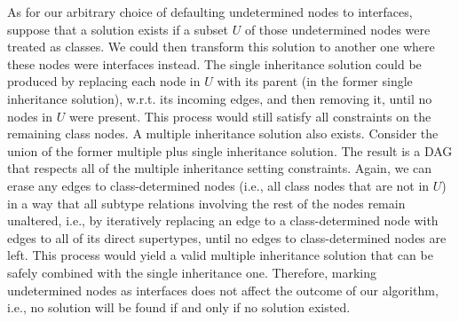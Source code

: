 As for our arbitrary choice of defaulting undetermined nodes to
interfaces, suppose that a solution exists if a subset $U$ of those
undetermined nodes were treated as classes. We could then transform
this solution to another one where these nodes were interfaces
instead. The single inheritance solution could be produced by
replacing each node in $U$ with its parent (in the former single
inheritance solution), w.r.t. its incoming edges, and then removing
it, until no nodes in $U$ were present. This process would still
satisfy all constraints on the remaining class nodes. A multiple
inheritance solution also exists. Consider the union of the former
multiple plus single inheritance solution. The result is a DAG that
respects all of the multiple inheritance setting constraints. Again,
we can erase any edges to class-determined nodes (i.e., all class nodes
that are not in $U$) in a way that all subtype relations involving the
rest of the nodes remain unaltered, i.e., by iteratively replacing an
edge to a class-determined node with edges to all of its direct
supertypes, until no edges to class-determined nodes are left. This
process would yield a valid multiple inheritance solution that can be
safely combined with the single inheritance one. Therefore, marking
undetermined nodes as interfaces does not affect the outcome of our
algorithm, i.e., no solution will be found if and only if no solution
existed.





